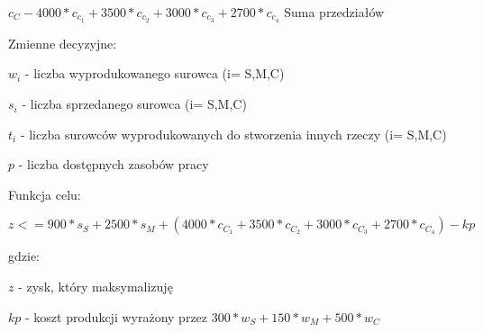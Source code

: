 \documentclass{article}
\begin{document}
$c_C - 4000 * c_c_1 + 3500 * c_c_2 + 3000 * c_c_3 + 2700 * c_c_4$ Suma przedziałów

Zmienne decyzyjne:

$w_i$ - liczba wyprodukowanego surowca (i= S,M,C)

$s_i$ - liczba sprzedanego surowca (i= S,M,C)

$t_i$ - liczba surowców wyprodukowanych do stworzenia innych rzeczy (i= S,M,C)

$p$ - liczba dostępnych zasobów pracy

Funkcja celu:

$z <= 900 * s_S + 2500 * s_M + (4000 * c_C_1 + 3500 * c_C_2 + 3000 * c_C_3 + 2700 * c_C_4) - kp$

gdzie:

$z$ - zysk, który maksymalizuję

$kp$ - koszt produkcji wyrażony przez $300 * w_S + 150 * w_M + 500 * w_C$









\lstset{language=AMPL}
\begin{lstlisting}
\end{lstlisting}
\end{document}
